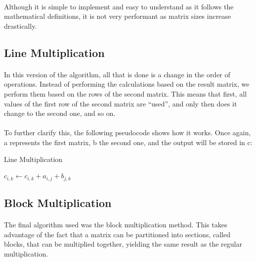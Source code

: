 \documentclass{report}
\begin{document}
    \paragraph{}Although it is simple to implement and easy to understand as it follows the mathematical definitions, it is not very performant as matrix sizes increase drastically.

    \subsection*{Line Multiplication}

    \paragraph{}In this version of the algorithm, all that is done is a change in the order of operations. Instead of performing the calculations based on the result matrix, we perform them based on the rows of the second matrix. This means that first, all values of the first row of the second matrix are ``used'', and only then does it change to the second one, and so on.

    \newpage

    \paragraph{}To further clarify this, the following pseudocode shows how it works. Once again, a represents the first matrix, b the second one, and the output will be stored in c:

    \begin{algorithm}
      \caption{Line Multiplication}\label{euclid}
      \begin{algorithmic}[1]
        \State $c_{i, k} \leftarrow c_{i, k} + a_{i, j} + b_{j, k}$
        \EndFor
        \EndFor
        \EndFor
        \EndProcedure
      \end{algorithmic}
    \end{algorithm}

    \subsection*{Block Multiplication}

    \paragraph{}The final algorithm used was the block multiplication method. This takes advantage of the fact that a matrix can be partitioned into sections, called blocks, that can be multiplied together, yielding the same result as the regular multiplication.
\end{document}

